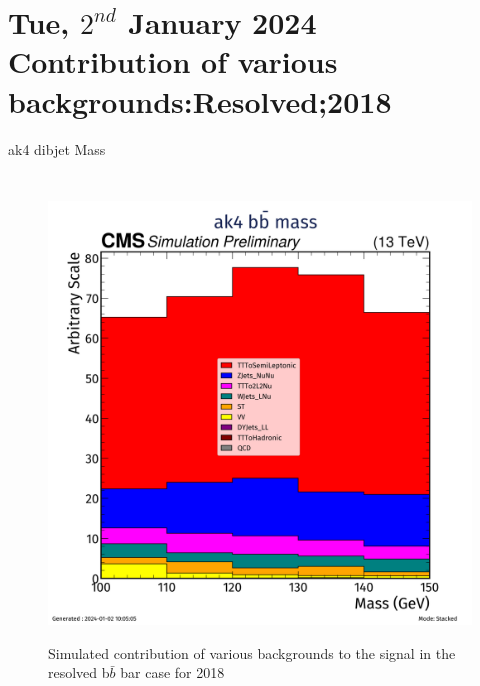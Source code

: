\documentclass[10pt,xcolor=dvipsnames]{beamer}
\begin{document}

\section[Contribution of various backgrounds:Resolved;2018]{Tue, $2^{nd}$ January 2024 \\ Contribution of various backgrounds:Resolved;2018}


     \begin{frame}[fragile]{ak4 dibjet Mass}
      \begin{columns}
        \begin{figure}
          \centering
          \includegraphics[width=1\textwidth]{../Backgrounds/plots/SR_Resolved_Backgrounds_dijet_mass_Combined.png}
          \label{contribution}
          \caption{Simulated contribution of various backgrounds to the signal in the resolved b$ \bar{b} $ bar case for 2018}
        \end{figure}

\end{columns}
\end{frame}
\end{document}
